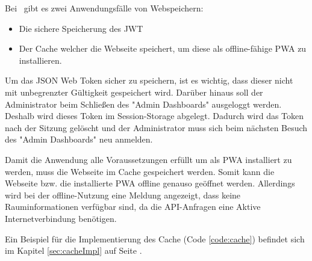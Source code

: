 
Bei \ZELIA\ gibt es zwei Anwendungsfälle von Webspeichern:

\begin{itemize}
    \item Die sichere Speicherung des JWT
    \item Der Cache welcher die Webseite speichert, um diese als offline-fähige PWA zu installieren.
\end{itemize}


Um das JSON Web Token sicher zu speichern, ist es wichtig, dass dieser nicht mit unbegrenzter Gültigkeit gespeichert wird. Darüber hinaus soll der Administrator beim Schließen des "Admin Dashboards" ausgeloggt werden. Deshalb wird dieses Token im Session-Storage abgelegt. Dadurch wird das Token nach der Sitzung gelöscht und der Administrator muss sich beim nächsten Besuch des "Admin Dashboards" neu anmelden.


Damit die Anwendung alle Voraussetzungen erfüllt um als PWA installiert zu werden, muss die Webseite im Cache gespeichert werden. Somit kann die Webseite bzw. die installierte PWA offline genauso geöffnet werden. Allerdings wird bei der offline-Nutzung eine Meldung angezeigt, dass keine Rauminformationen verfügbar sind, da die API-Anfragen eine Aktive Internetverbindung benötigen.

Ein Beispiel für die Implementierung des Cache (Code \ref{code:cache}) befindet sich im Kapitel \ref{sec:cacheImpl} auf Seite \pageref{code:cache}.
 